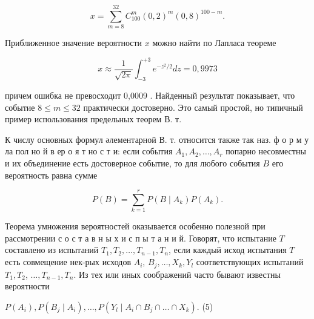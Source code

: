 \documentclass[10pt]{article}
\begin{document}
\[

x=\sum_{m=8}^{32} C_{100}^{m}(0,2)^{m}(0,8)^{100-m} .

\]



Приближенное значение вероятности $x$ можно найти по Лапласа теореме



\[

x \approx \frac{1}{\sqrt{2 \pi}} \int_{-3}^{+3} e^{-z^{2} / 2} d z=0,9973

\]



причем ошибка не превосходит 0,0009 . Найденный результат показывает, что событие $8 \leqslant m \leqslant 32$ практически достоверно. Это самый простой, но типичный пример использования предельных теорем В. т.



К числу основных формул әлементарной В. т. относится также так наз. ф о р м у ла пол но й в ер о я т но с т и: если события $A_{1}, A_{2}, \ldots, A_{r}$ попарно несовместны и их объединение есть достоверное событие, то для любого события $B$ его вероятность равна сумме



\[

P(B)=\sum_{k=1}^{r} P\left(B \mid A_{k}\right) P\left(A_{k}\right) .

\]



Теорема умножения вероятностей оказывается особенно полезной при рассмотрении с о с т а в н ы х и с п ы т а н и й. Говорят, что испытание $T$ составлено из испытаний $T_{1}, T_{2}, \ldots, T_{n-1}, T_{n}$, если каждый исход испытания $T$ есть совмещение нек-рых исходов $A_{i}$, $B_{j}, \ldots, X_{k}, Y_{l}$ соответствующих испытаний $T_{1}, T_{2}$, $\ldots, T_{n-1}, T_{n}$. Из тех или иных соображений часто бывают известны вероятности



$P\left(A_{i}\right), P\left(B_{j} \mid A_{i}\right), \ldots, P\left(Y_{l} \mid A_{i} \cap B_{j} \cap \ldots \cap X_{k}\right)$. (5)
\end{document}
